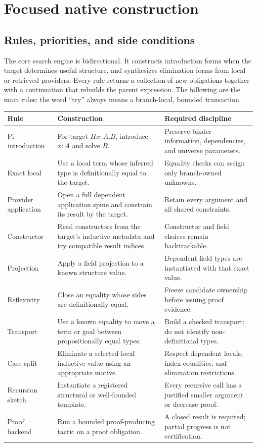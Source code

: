 \section{Focused native construction}
\label{sec:focused}
\subsection{Rules, priorities, and side conditions}
The core search engine is bidirectional. It constructs introduction forms when the target determines useful structure, and synthesizes elimination forms from local or retrieved providers. Every rule returns a collection of new obligations together with a continuation that rebuilds the parent expression. The following are the main rules; the word ``try'' always means a branch-local, bounded transaction.

\begin{longtable}{@{}L{0.18\textwidth}L{0.39\textwidth}L{0.36\textwidth}@{}}
\toprule
Rule & Construction & Required discipline\\\midrule\endhead
Pi introduction & For target $\Pi x:A.B$, introduce $x:A$ and solve $B$. & Preserve binder information, dependencies, and universe parameters.\\
Exact local & Use a local term whose inferred type is definitionally equal to the target. & Equality checks can assign only branch-owned unknowns.\\
Provider application & Open a full dependent application spine and constrain its result by the target. & Retain every argument and all shared constraints.\\
Constructor & Read constructors from the target's inductive metadata and try compatible result indices. & Constructor and field choices remain backtrackable.\\
Projection & Apply a field projection to a known structure value. & Dependent field types are instantiated with that exact value.\\
Reflexivity & Close an equality whose sides are definitionally equal. & Freeze candidate ownership before issuing proof evidence.\\
Transport & Use a known equality to move a term or goal between propositionally equal types. & Build a checked transport; do not identify non-definitional types.\\
Case split & Eliminate a selected local inductive value using an appropriate motive. & Respect dependent locals, index equalities, and elimination restrictions.\\
Recursion sketch & Instantiate a registered structural or well-founded template. & Every recursive call has a justified smaller argument or decrease proof.\\
Proof backend & Run a bounded proof-producing tactic on a proof obligation. & A closed result is required; partial progress is not certification.\\
\bottomrule
\end{longtable}

